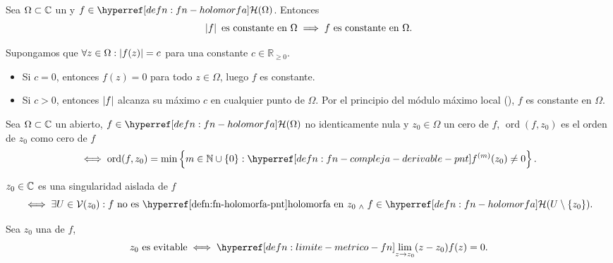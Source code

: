 \begin{prop}\label{prop:modulo-constante-imp-constante}
    Sea $\Omega \subset \mathbb{C}$ un  y $f \in \exhyperref[defn:fn-holomorfa]{fn-holomorfa}{\mathcal{H}}(\Omega)$. Entonces
    \[
    \left|f\right| \text{ es constante en } \Omega \implies f \text{ es constante en } \Omega.
    \]
\end{prop}
\begin{dem}
    Supongamos que $\forall z \in \Omega : \left|f(z)\right| = c$ para una constante $c \in \mathbb{R}_{\geq 0}$.
    \begin{itemize}
        \item Si $c = 0$, entonces $f(z) = 0$ para todo $z \in \Omega$, luego $f$ es constante.
        \item Si $c > 0$, entonces $\left|f\right|$ alcanza su máximo $c$ en cualquier punto de $\Omega$. Por el principio del módulo máximo local (), $f$ es constante en $\Omega$.
    \end{itemize}

    \vspace{-\baselineskip}
\end{dem}

\begin{defn}\label{defn:orden-cero-fn-holomorfa}
    Sea $\Omega \subset \mathbb{C}$ un abierto, $f \in \exhyperref[defn:fn-holomorfa]{fn-holomorfa}{\mathcal{H}}(\Omega)$ no identicamente nula y $z_0 \in \Omega$ un cero de $f$, $\operatorname{ord}(f, z_0)$ es el orden de $z_0$ como cero de $f$
    \[
    \iff \operatorname{ord}(f, z_0) = \min \left\{m \in \N \cup \{0\} : \exhyperref[defn:fn-compleja-derivable-pnt]{fn-compleja-derivable-pnt}{f^{(m)}(z_0)} \neq 0\right\}.
    \]
\end{defn}


\begin{defn}\label{defn:singularidad-aislada}
    $z_0 \in \mathbb{C}$ es una singularidad aislada de $f$
    \[
    \iff \exists U \in \mathcal{V}(z_0) : f \tex{ no es \exhyperref[defn:fn-holomorfa-pnt]{fn-holomorfa-pnt}{holomorfa} en }z_0 \we f \in \exhyperref[defn:fn-holomorfa]{fn-holomorfa}{\mathcal{H}}(U \setminus \{z_0\}).
    \]
\end{defn}

\begin{defn}\label{defn:singularidad-evitable}
    Sea $z_0$ una  de $f$,
    \[
    z_0\tex{ es evitable}\iff \exhyperref[defn:limite-metrico-fn]{limite-fn}{\lim_{z \to z_0}} (z - z_0) f(z) = 0.
    \]
\end{defn}

